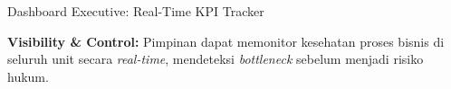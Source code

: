 \documentclass[aspectratio=169,11pt]{beamer}
\begin{document}
\begin{frame}{Dashboard Executive: Real-Time KPI Tracker}
{%
    }
    \vspace{0.1cm}
    \begin{center}
        \begin{minipage}{0.7\textwidth}
            \begin{orangebox}
                \scriptsize \textbf{Visibility \& Control:} Pimpinan dapat memonitor kesehatan proses bisnis di seluruh unit secara \textit{real-time}, mendeteksi \textit{bottleneck} sebelum menjadi risiko hukum.
            \end{orangebox}
        \end{minipage}
    \end{center}
\end{frame}
\end{document}
